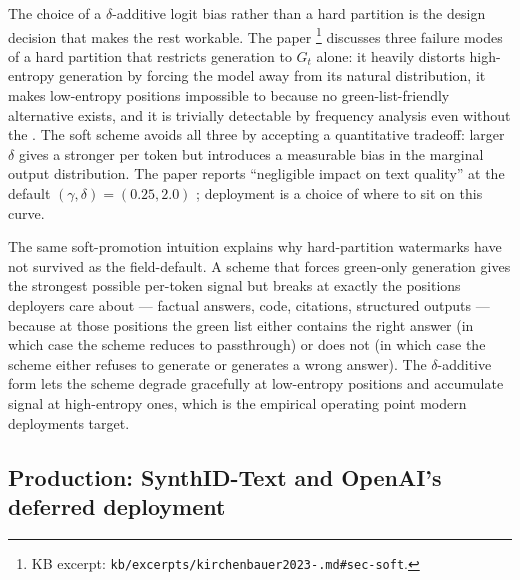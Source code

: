 The choice of a $\delta$-additive logit bias rather than a hard
partition is the design decision that makes the rest workable. The
paper%
\footnote{KB excerpt: \texttt{kb/excerpts/kirchenbauer2023-.md\#sec-soft}.}
discusses three failure modes of a hard partition that restricts
generation to $G_t$ alone: it heavily distorts high-entropy
generation by forcing the model away from its natural distribution,
it makes low-entropy positions impossible to  because no
green-list-friendly alternative exists, and it is trivially detectable
by frequency analysis even without the . The soft scheme avoids
all three by accepting a quantitative tradeoff: larger $\delta$ gives
a stronger  per token but introduces a measurable bias in
the marginal output distribution. The paper reports
``negligible impact on text quality'' at the default
$(\gamma, \delta) = (0.25, 2.0)$
\citep[\S{}abstract]{kirchenbauer2023-watermark}; deployment is a
choice of where to sit on this curve.

The same soft-promotion intuition explains why hard-partition
watermarks have not survived as the field-default. A scheme that
forces green-only generation gives the strongest possible per-token
signal but breaks at exactly the positions deployers care about ---
factual answers, code, citations, structured outputs --- because at
those positions the green list either contains the right answer (in
which case the scheme reduces to passthrough) or does not (in which
case the scheme either refuses to generate or generates a wrong
answer). The $\delta$-additive form lets the scheme degrade
gracefully at low-entropy positions and accumulate signal at
high-entropy ones, which is the empirical operating point modern
deployments target.

\subsection{Production: SynthID-Text and OpenAI's deferred deployment}
\label{sec:watermarking-production}

